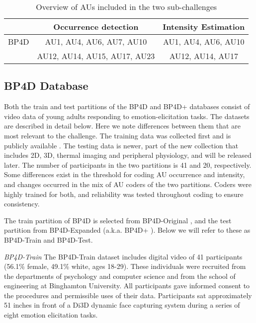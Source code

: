 \documentclass[a4paper, 10pt, conference]{ieeeconf}      \usepackage{FG2017}
\begin{document}
\begin{table}
\begin{center}
\caption{Overview of AUs included in the two sub-challenges}
\label{t:challengeAUs}
\begin{tabular}{|l|c|c|}
\hline
 & \bf{Occurrence detection} & \bf{Intensity Estimation} \\
\hline
BP4D & AU1, AU4, AU6, AU7, AU10 & AU1, AU4, AU6, AU10  \\
& AU12, AU14, AU15, AU17, AU23 & AU12, AU14, AU17 \\
\hline
\end{tabular}
\end{center}
\end{table}

\subsection{BP4D Database}



\noindent Both the train and test partitions of the BP4D and BP4D+ databases consist of video data of young adults responding to emotion-elicitation tasks. The datasets are described in detail below. Here we note differences between them that are most relevant to the challenge. The training data was collected first and is publicly available \cite{ZhangEtAl2014_BHS}. The testing data is newer, part of the new collection \cite{ZhangEtAl2016_MSE} that includes 2D, 3D, thermal imaging and peripheral physiology, and will be released later. The number of participants in the two partitions is 41 and 20, respectively. Some differences exist in the threshold for coding AU occurrence and intensity, and changes occurred in the mix of AU coders of the two partitions. Coders were highly trained for both, and reliability was tested throughout coding to ensure consistency. 

The train partition of BP4D is selected from BP4D-Original \cite{ZhangEtAl2014_BHS}, and the test partition from BP4D-Expanded (a.k.a. BP4D+ \cite{ZhangEtAl2016_MSE}). Below we will refer to these as BP4D-Train and BP4D-Test.

\emph{BP4D-Train}
The BP4D-Train dataset includes digital video of 41 participants (56.1\% female, 49.1\% white, ages 18-29). These individuals were recruited from the departments of psychology and computer science and from the school of engineering at Binghamton University. All participants gave informed consent to the procedures and permissible uses of their data. Participants sat approximately 51 inches in front of a Di3D dynamic face capturing system during a series of eight emotion elicitation tasks.
\end{document}
